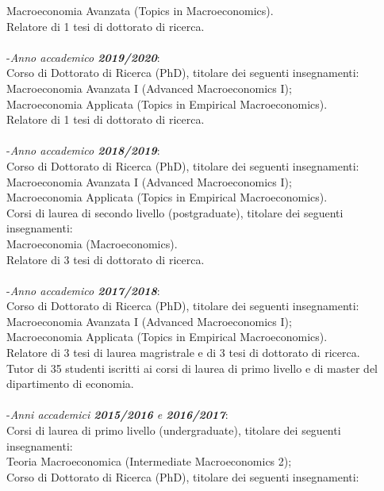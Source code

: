\documentclass[10p]{article}
\begin{document}
Macroeconomia Avanzata (Topics in Macroeconomics).\\
Relatore di 1 tesi di dottorato di ricerca.\\
\\
-\emph{Anno accademico \textbf{2019/2020}}: \\
Corso di Dottorato di Ricerca (PhD), titolare dei seguenti insegnamenti:\\
Macroeconomia Avanzata I (Advanced Macroeconomics I);\\
Macroeconomia Applicata (Topics in Empirical Macroeconomics).\\
Relatore di 1 tesi di dottorato di ricerca.\\
\\
-\emph{Anno accademico \textbf{2018/2019}}: \\
Corso di Dottorato di Ricerca (PhD), titolare dei seguenti insegnamenti:\\
Macroeconomia Avanzata I (Advanced Macroeconomics I);\\
Macroeconomia Applicata (Topics in Empirical Macroeconomics).\\
Corsi di laurea di secondo livello (postgraduate), titolare dei seguenti insegnamenti: \\
Macroeconomia (Macroeconomics).\\
Relatore di 3 tesi di dottorato di ricerca.\\
\\
-\emph{Anno accademico \textbf{2017/2018}}: \\
Corso di Dottorato di Ricerca (PhD), titolare dei seguenti insegnamenti:\\
Macroeconomia Avanzata I (Advanced Macroeconomics I);\\
Macroeconomia Applicata (Topics in Empirical Macroeconomics).\\
Relatore di 3 tesi di laurea magristrale e di 3 tesi di dottorato di ricerca.\\
Tutor di 35 studenti iscritti ai corsi di laurea di primo livello e di master del dipartimento di economia.\\
\\
-\emph{Anni accademici \textbf{2015/2016} e \textbf{2016/2017}}: \\
Corsi di laurea di primo livello (undergraduate), titolare dei seguenti insegnamenti: \\
Teoria Macroeconomica (Intermediate Macroeconomics 2); \\
Corso di Dottorato di Ricerca (PhD), titolare dei seguenti insegnamenti:\\
\end{document}
